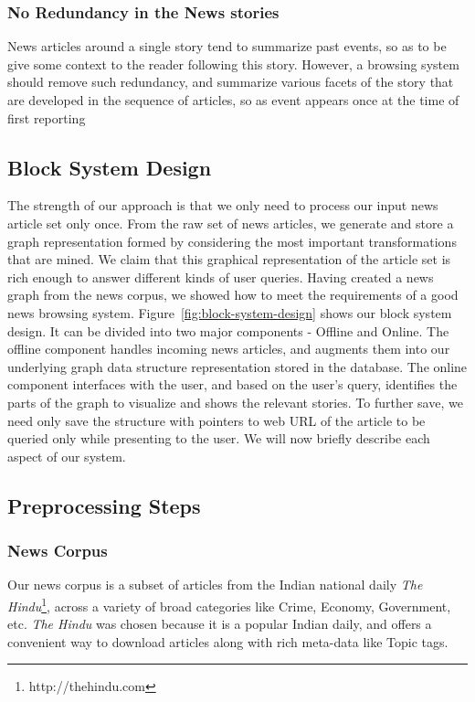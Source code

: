 \subsubsection{No Redundancy in the News stories}
News articles around a single story tend to summarize past events, so as to be give some 
context to the reader following this story. However, a browsing system should remove such redundancy, and summarize various facets of the story
that are developed in the sequence of articles, so as event appears once at the time of first reporting
\subsection{Block System Design}
\label{sec:block}

The strength of our approach is that we only need to process our input news article set only once. From the raw set of news articles, we
generate and store a graph representation formed by considering the most important transformations that are mined. We claim that this graphical 
representation of the article set is rich enough to answer different kinds of user queries. Having created a news graph from the news corpus, we showed how to meet the requirements of a good news browsing system.
Figure~\ref{fig:block-system-design} shows our block system design. It can be divided into
two major components - Offline and Online. The offline component handles incoming news articles, and augments them into our underlying graph data structure representation stored
in the database. The online component interfaces with the user, and based on the user's query, identifies the parts of the graph to visualize and 
shows the relevant stories. To further save, we need only save the structure with pointers to web URL of the article to be queried only while presenting to the user. We will now briefly describe each aspect of our system.
\subsection{Preprocessing Steps}
\subsubsection*{News Corpus}
Our news corpus is a subset of articles from the Indian national daily {\em The Hindu}\footnote{http://thehindu.com}, across a variety of broad categories like Crime, Economy, Government, etc. 
{\em The Hindu} was chosen because it is a popular Indian daily, and offers a convenient way to download articles along with rich meta-data like Topic tags.
